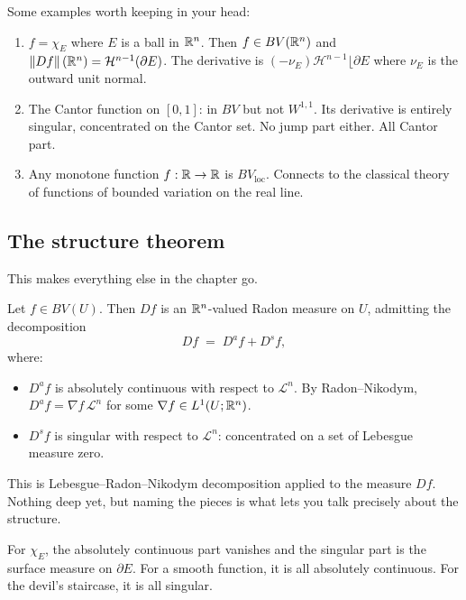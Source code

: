 \begin{example}\label{ex:bv-canonical}
Some examples worth keeping in your head:
\begin{enumerate}
  \item $f = \chi_E$ where $E$ is a ball in $\mathbb{R}^n$. Then $f \in BV(\mathbb{R}^n)$ and $\left\|Df\right\|(\mathbb{R}^n) = \mathcal{H}^{n-1}(\partial E)$. The derivative is $(-\nu_E) \mathcal{H}^{n-1} \lfloor \partial E$ where $\nu_E$ is the outward unit normal.
  \item The Cantor function on $[0,1]$: in $BV$ but not $W^{1,1}$. Its derivative is entirely singular, concentrated on the Cantor set. No jump part either. All Cantor part.
  \item Any monotone function $f: \mathbb{R} \to \mathbb{R}$ is $BV_{\text{loc}}$. Connects to the classical theory of functions of bounded variation on the real line.
\end{enumerate}
\end{example}

\subsection{The structure theorem}\label{subsec:structure}

This makes everything else in the chapter go.

\begin{theorem}\label{thm:structure-bv}
Let $f \in BV(U)$. Then $Df$ is an $\mathbb{R}^n$-valued Radon measure on $U$, admitting the decomposition
\[
  Df \;=\; D^a f + D^s f,
\]
where:
\begin{itemize}
  \item $D^a f$ is absolutely continuous with respect to $\mathcal{L}^n$. By Radon--Nikodym, $D^a f = \nabla f \, \mathcal{L}^n$ for some $\nabla f \in L^1(U;\mathbb{R}^n)$.
  \item $D^s f$ is singular with respect to $\mathcal{L}^n$: concentrated on a set of Lebesgue measure zero.
\end{itemize}
\end{theorem}

This is Lebesgue--Radon--Nikodym decomposition applied to the measure $Df$. Nothing deep yet, but naming the pieces is what lets you talk precisely about the structure.

For $\chi_E$, the absolutely continuous part vanishes and the singular part is the surface measure on $\partial E$. For a smooth function, it is all absolutely continuous. For the devil's staircase, it is all singular.

